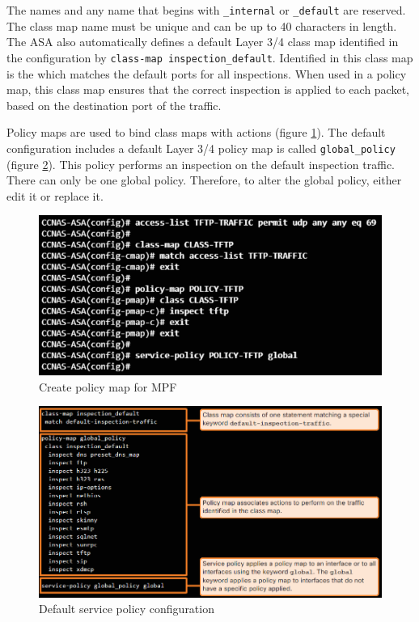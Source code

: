 The names  and any name that begins with \verb|_internal| or \verb|_default| are reserved. The class map name must be unique and can be up to 40 characters in length.\\

The ASA also automatically defines a default Layer 3/4 class map identified in the configuration by \verb|class-map inspection_default|. Identified in this class map is the  which matches the default ports for all inspections. When used in a policy map, this class map ensures that the correct inspection is applied to each packet, based on the destination port of the traffic.

Policy maps are used to bind class maps with actions (figure \ref{MPFimplementation}). The default configuration includes a default Layer 3/4 policy map is called \verb|global_policy| (figure \ref{DefaultPolicy}). This policy performs an inspection on the default inspection traffic. There can only be one global policy. Therefore, to alter the global policy, either edit it or replace it.

\begin{figure}[hbtp]
\caption{Create policy map for MPF}\label{MPFimplementation}
\centering
\includegraphics[scale=0.7]{pictures/MPFimplementation.PNG}
\end{figure}

\begin{figure}[hbtp]
\caption{Default service policy configuration}\label{DefaultPolicy}
\centering
\includegraphics[scale=1]{pictures/DefaultPolicy.PNG}
\end{figure}
